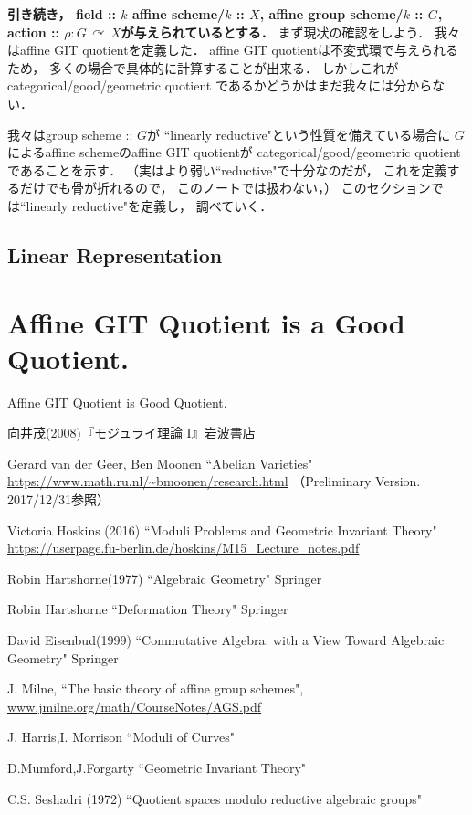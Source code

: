 \documentclass[a4paper]{jsarticle}
\newcommand{\acton}{\,\curvearrowright\,}
\begin{document}
    \textbf
    {
    引き続き，
    field :: $k$
    affine scheme/$k$ :: $X$,
    affine group scheme/$k$ :: $G$,
    action :: $\rho: G \acton X$が与えられているとする．
    }
    まず現状の確認をしよう．
    我々はaffine GIT quotientを定義した．
    affine GIT quotientは不変式環で与えられるため，
    多くの場合で具体的に計算することが出来る．
    しかしこれがcategorical/good/geometric quotient
    であるかどうかはまだ我々には分からない．
    
    我々はgroup scheme :: $G$が
    ``linearly reductive"という性質を備えている場合に
    $G$によるaffine schemeのaffine GIT quotientが
    categorical/good/geometric quotientであることを示す．
    （実はより弱い``reductive"で十分なのだが，
    これを定義するだけでも骨が折れるので，
    このノートでは扱わない，）
    このセクションでは``linearly reductive"を定義し，
    調べていく．

    \subsection{Linear Representation} 
    \begin{Def}
        
    \end{Def}

\section{Affine GIT Quotient is a Good Quotient.}
    \begin{Thm}\label{thm:git=good}
        Affine GIT Quotient is Good Quotient.
    \end{Thm}

\begin{thebibliography}{99}
        向井茂(2008)『モジュライ理論 I』岩波書店

        Gerard van der Geer, Ben Moonen
        ``Abelian Varieties"
        \url{https://www.math.ru.nl/~bmoonen/research.html}
        （Preliminary Version. 2017/12/31参照）

    Victoria Hoskins (2016)
    ``Moduli Problems and Geometric Invariant Theory"
    \url{https://userpage.fu-berlin.de/hoskins/M15_Lecture_notes.pdf}

    Robin Hartshorne(1977)
    ``Algebraic Geometry"
    Springer

    Robin Hartshorne
    ``Deformation Theory"
    Springer

    David Eisenbud(1999)
    ``Commutative Algebra: with a View Toward Algebraic Geometry"
    Springer
    
    J. Milne, ``The basic theory of affine group schemes", 
    \url{www.jmilne.org/math/CourseNotes/AGS.pdf}

    J. Harris,I. Morrison ``Moduli of Curves"

        D.Mumford,J.Forgarty ``Geometric Invariant Theory"

    C.S. Seshadri (1972)
    ``Quotient spaces modulo reductive algebraic groups"
\end{thebibliography}
\end{document}
